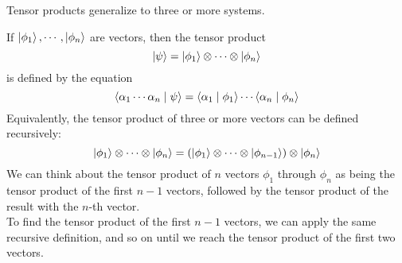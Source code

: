 \documentclass{report}
\begin{document}

Tensor products generalize to three or more systems.

\bigbreak

If $\ket{\phi_1},\cdots,\ket{\phi_n}$ are vectors, then the tensor product
\begin{equation*}
    \ket{\psi}=\ket{\phi_1}\otimes\cdots\otimes\ket{\phi_n}
\end{equation*}
is defined by the equation 
\begin{equation*}
    \braket{\alpha_1\cdots\alpha_n\mid\psi}=\braket{\alpha_1\mid\phi_1}\cdots\braket{\alpha_n\mid\phi_n}
\end{equation*}
Equivalently, the tensor product of three or more vectors can be defined recursively:
\begin{equation*}
    \ket{\phi_1}\otimes\cdots\otimes\ket{\phi_n}=(\ket{\phi_1}\otimes\cdots\otimes\ket{\phi_{n-1}})\otimes\ket{\phi_n}
\end{equation*}
We can think about the tensor product of $n$ vectors $\phi_1$ through $\phi_n$ as being the tensor product of the first $n-1$ vectors, followed by the tensor product of the result with the $n$-th vector.\\[1em]
To find the tensor product of the first $n-1$ vectors, we can apply the same recursive definition, and so on until we reach the tensor product of the first two vectors.
\end{document}
